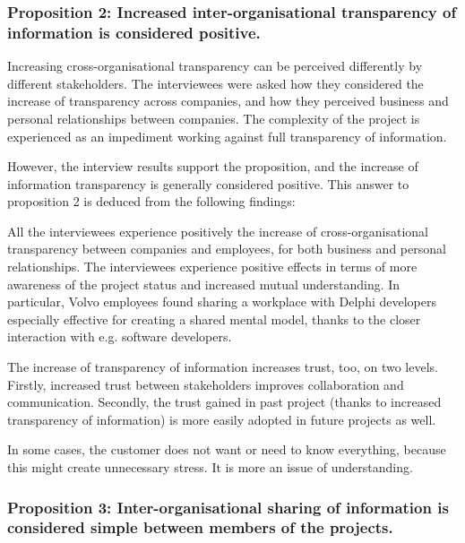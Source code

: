 \subsubsection{Proposition 2: Increased inter-organisational transparency of information is considered positive.}

Increasing cross-organisational transparency can be perceived differently by different stakeholders. The interviewees were asked how they considered the increase of transparency across companies, and how they perceived business and personal relationships between companies. The complexity of the project is experienced as an impediment working against full transparency of information.

However, the interview results support the proposition, and the increase of information transparency is generally considered positive. This answer to proposition 2 is deduced from the following findings:

 All the interviewees experience positively the increase of cross-organisational transparency between companies and employees, for both business and personal relationships. The interviewees experience positive effects in terms of more awareness of the project status and increased mutual understanding. In particular, Volvo employees found sharing a workplace with Delphi developers especially effective for creating a shared mental model, thanks to the closer interaction with e.g. software developers.

 The increase of transparency of information increases trust, too, on two levels. Firstly, increased trust between stakeholders improves collaboration and communication. Secondly, the trust gained in past project (thanks to increased transparency of information) is more easily adopted in future projects as well. 

 In some cases, the customer does not want or need to know everything, because this might create unnecessary stress. It is more an issue of understanding. 

\subsubsection{Proposition 3: Inter-organisational sharing of information is considered simple between members of the projects.}

